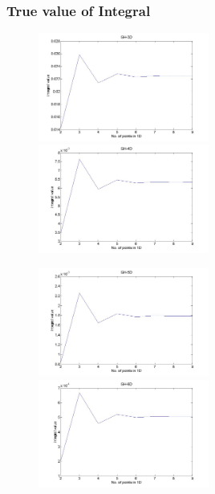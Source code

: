 \documentclass{beamer}
\begin{document}
\begin{frame}
\frametitle{True value of Integral}
   \begin{figure}[thpb]
      \centering
      \includegraphics[width=0.5\textwidth]{3dGH_for_gauss_sqr.jpg}
      \includegraphics[width=0.5\textwidth]{4dGH_for_gauss_sqr.jpg}
      \label{fig:23d4m1}
   \end{figure} 

   \begin{figure}[thpb]
      \centering
      \includegraphics[width=0.5\textwidth]{5dGH_for_gauss_sqr.jpg}
      \includegraphics[width=0.5\textwidth]{6dGH_for_gauss_sqr.jpg}
   \end{figure} 
\end{frame}
\end{document}
